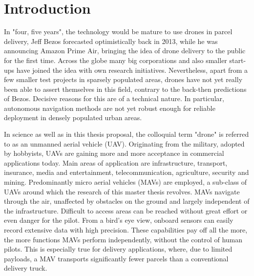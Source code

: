 
\chapter{Introduction} %

\label{Chapter1} %

In "four, five years", the technology would be mature to use drones in parcel delivery,
Jeff Bezos forecasted optimistically back in 2013, 
while he was announcing Amazon Prime Air,
bringing the idea of drone delivery to the public for the first time. \cite{Hamilton2019}
Across the globe many big corporations and also smaller start-ups have
joined the idea with own research initiatives.
Nevertheless, apart from a few smaller test projects in sparsely populated areas, 
drones have not yet really been able to assert themselves in this field,
contrary to the back-then predictions of Bezos.
Decisive reasons for this are of a technical nature.
In particular, autonomous navigation methods are not yet robust enough 
for reliable deployment in densely populated urban areas. \cite{loquercio2018learning}

In science as well as in this thesis proposal, 
the colloquial term "drone" is referred to as an unmanned aerial vehicle (UAV).
Originating from the military, adopted by hobbyists,
UAVs are gaining more and more acceptance in commercial applications today.
Main areas of application are 
infrastructure, transport, insurance, media and entertainment, telecommunication, agriculture, security and mining. \cite{PwC2016}
Predominantly micro aerial vehicles (MAVs) are employed,
a sub-class of UAVs around which the research of this master thesis revolves.
MAVs navigate through the air, unaffected by obstacles on the ground and largely independent of the infrastructure. 
Difficult to access areas can be reached without great effort or even danger for the pilot.
From a bird's eye view, onboard sensors can easily record extensive data with high precision.
These capabilities pay off all the more,
the more functions MAVs perform independently, without the control of human pilots.
This is especially true for delivery applications, 
where, due to limited payloads, a MAV transports significantly fewer parcels than a conventional delivery truck.

